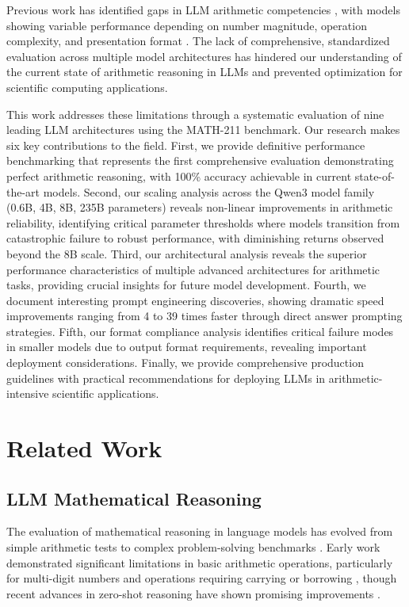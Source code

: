 \documentclass{article}
\begin{document}
Previous work has identified gaps in LLM arithmetic competencies \citep{yuan2023arithmetic, trask2018nalu}, with models showing variable performance depending on number magnitude, operation complexity, and presentation format \citep{razeghi2022impact}. The lack of comprehensive, standardized evaluation across multiple model architectures has hindered our understanding of the current state of arithmetic reasoning in LLMs and prevented optimization for scientific computing applications.

This work addresses these limitations through a systematic evaluation of nine leading LLM architectures using the MATH-211 benchmark. Our research makes six key contributions to the field. First, we provide definitive performance benchmarking that represents the first comprehensive evaluation demonstrating perfect arithmetic reasoning, with 100\% accuracy achievable in current state-of-the-art models. Second, our scaling analysis across the Qwen3 model family (0.6B, 4B, 8B, 235B parameters) reveals non-linear improvements in arithmetic reliability, identifying critical parameter thresholds where models transition from catastrophic failure to robust performance, with diminishing returns observed beyond the 8B scale. Third, our architectural analysis reveals the superior performance characteristics of multiple advanced architectures for arithmetic tasks, providing crucial insights for future model development. Fourth, we document interesting prompt engineering discoveries, showing dramatic speed improvements ranging from 4 to 39 times faster through direct answer prompting strategies. Fifth, our format compliance analysis identifies critical failure modes in smaller models due to output format requirements, revealing important deployment considerations. Finally, we provide comprehensive production guidelines with practical recommendations for deploying LLMs in arithmetic-intensive scientific applications.

\section{Related Work}

\subsection{LLM Mathematical Reasoning}

The evaluation of mathematical reasoning in language models has evolved from simple arithmetic tests to complex problem-solving benchmarks \citep{hendrycks2021math_dataset, pan2024mathqa, cobbe2021gsm8k}. Early work demonstrated significant limitations in basic arithmetic operations, particularly for multi-digit numbers and operations requiring carrying or borrowing \citep{brown2020gpt3}, though recent advances in zero-shot reasoning have shown promising improvements \citep{kojima2022zero_shot}.
\end{document}
